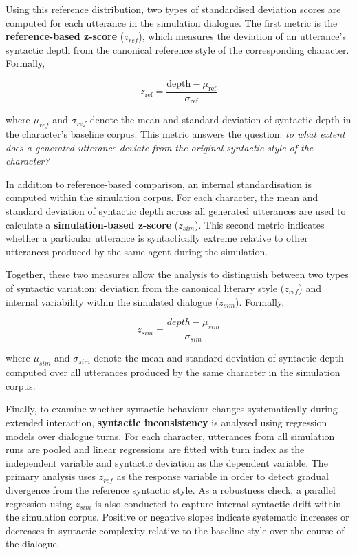 \documentclass{article}
\begin{document}
Using this reference distribution, two types of standardised deviation scores are computed for each utterance in the simulation dialogue. The first metric is the \textbf{reference-based z-score} ($z_{ref}$), which measures the deviation of an utterance’s syntactic depth from the canonical reference style of the corresponding character. Formally,

\begin{equation}
    z_{\mathrm{ref}} = \frac{\mathrm{depth} - \mu_{\mathrm{ref}}}{\sigma_{\mathrm{ref}}}
    \label{eq:reference-based z-score}
\end{equation}


where $\mu_{ref}$ and $\sigma_{ref}$ denote the mean and standard deviation of syntactic depth in the character’s baseline corpus. This metric answers the question: \emph{to what extent does a generated utterance deviate from the original syntactic style of the character?}

In addition to reference-based comparison, an internal standardisation is computed within the simulation corpus. For each character, the mean and standard deviation of syntactic depth across all generated utterances are used to calculate a \textbf{simulation-based z-score} ($z_{sim}$). This second metric indicates whether a particular utterance is syntactically extreme relative to other utterances produced by the same agent during the simulation.

Together, these two measures allow the analysis to distinguish between two types of syntactic variation: deviation from the canonical literary style ($z_{ref}$) and internal variability within the simulated dialogue ($z_{sim}$). Formally,

\begin{equation}
    z_{sim} = \frac{depth - \mu_{sim}}{\sigma_{sim}}
    \label{eq:simulation-based z-score}
\end{equation}

where $\mu_{sim}$ and $\sigma_{sim}$ denote the mean and standard deviation of syntactic depth computed over all utterances produced by the same character in the simulation corpus.

Finally, to examine whether syntactic behaviour changes systematically during extended interaction, \textbf{syntactic inconsistency} is analysed using regression models over dialogue turns. For each character, utterances from all simulation runs are pooled and linear regressions are fitted with turn index as the independent variable and syntactic deviation as the dependent variable. The primary analysis uses $z_{ref}$ as the response variable in order to detect gradual divergence from the reference syntactic style. As a robustness check, a parallel regression using $z_{sim}$ is also conducted to capture internal syntactic drift within the simulation corpus. Positive or negative slopes indicate systematic increases or decreases in syntactic complexity relative to the baseline style over the course of the dialogue.
\end{document}
